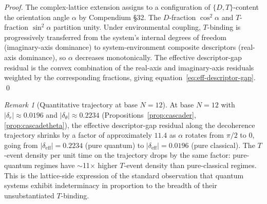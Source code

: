 \documentclass[11pt,a4paper]{article}
\theoremstyle{definition}
\theoremstyle{remark}
\newtheorem{remark}[theorem]{Remark}
\begin{document}
\begin{proof}
The complex-lattice extension assigns to a configuration of $\{D,T\}$-content the orientation angle $\alpha$ by Compendium \S32. The $D$-fraction $\cos^{2}\alpha$ and $T$-fraction $\sin^{2}\alpha$ partition unity. Under environmental coupling, $T$-binding is progressively transferred from the system's internal degrees of freedom (imaginary-axis dominance) to system-environment composite descriptors (real-axis dominance), so $\alpha$ decreases monotonically. The effective descriptor-gap residual is the convex combination of the real-axis and imaginary-axis residuals weighted by the corresponding fractions, giving equation~\eqref{eq:eff-descriptor-gap}. \qed
\end{proof}

\begin{remark}[Quantitative trajectory at base $N=12$]\label{rem:alpha-trajectory}
At base $N=12$ with $|\delta_{r}| \approx 0.0196$ and $|\delta_{\theta}| \approx 0.2234$ (Propositions~\ref{prop:cascader}, \ref{prop:cascadetheta}), the effective descriptor-gap residual along the decoherence trajectory shrinks by a factor of approximately $11.4$ as $\alpha$ rotates from $\pi/2$ to $0$, going from $|\delta_{\mathrm{eff}}|=0.2234$ (pure quantum) to $|\delta_{\mathrm{eff}}|=0.0196$ (pure classical). The $T$-event density per unit time on the trajectory drops by the same factor: pure-quantum regimes have $\sim$11$\times$ higher $T$-event density than pure-classical regimes. This is the lattice-side expression of the standard observation that quantum systems exhibit indeterminacy in proportion to the breadth of their unsubstantiated $T$-binding.
\end{remark}
\end{document}
